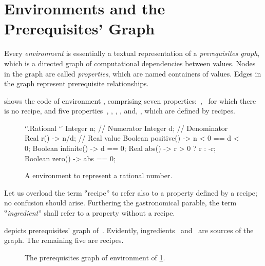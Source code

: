\section{Environments and the Prerequisites' Graph}

Every \emph{environment} is essentially a textual representation of a
\emph{prerequisites graph}, which is a directed graph of computational
dependencies between values. Nodes in the graph are called \emph{properties},
which are named containers of values. Edges in the graph represent prerequisite
relationships.

 shows the \Reap code of environment ,
comprising seven properties:~,~ for which there is no recipe, and
five properties~, , , , and, ,
which are defined by recipes.

\begin{figure}[H]\caption{\label{figure:rational}%
      A \Reap environment to represent a rational number.
    }
    \begin{adjustbox}{max width=\columnwidth}
\begin{reap}
`'.Rational {`'
  Integer n; // Numerator
  Integer d; // Denominator
  Real r() -> n/d; // Real value
  Boolean positive() -> n < 0 == d < 0;
  Boolean infinite() -> d == 0;
  Real abs() -> r > 0 ? r : -r;
  Boolean zero() -> abs == 0;
}
\end{reap}
\end{adjustbox}
\end{figure}

Let us overload the term ‟recipe” to refer also to a property defined by a
recipe; no confusion should arise. Furthering the gastronomical parable, the
term ‟\emph{ingredient}” shall refer to a property without a recipe.

 depicts prerequisites' graph
of~. Evidently, ingredients~ and~ are sources of the
graph. The remaining five are recipes.

\begin{figure}[H]
  \caption{\label{figure:rational:prerequisites}%
    The prerequisites graph of \Reap environment  of
    \cref{figure:rational}.
  }
  \begin{adjustbox}{max width=\columnwidth}
      
  \end{adjustbox}
\end{figure}

